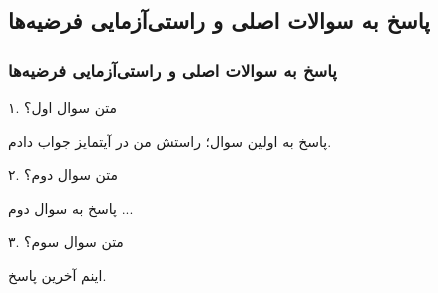 \label{answering_main_questions_and_study_hypothesis}

\subsection{پاسخ به سوالات اصلی و راستی‌آزمایی فرضیه‌ها}
\begin{frame}
\frametitle{پاسخ به سوالات اصلی و راستی‌آزمایی فرضیه‌ها}

\pause
\begin{block}{۱. متن سوال اول؟}

\pause
پاسخ به اولین سوال؛ راستش من در آیتمایز جواب دادم.
\end{block}

\pause
\begin{block}{۲. متن سوال دوم؟}
\pause

پاسخ به سوال دوم ...
\end{block}

\pause
\begin{block}{۳. متن سوال سوم؟}
\pause

اینم آخرین پاسخ.
\end{block}

\end{frame}
